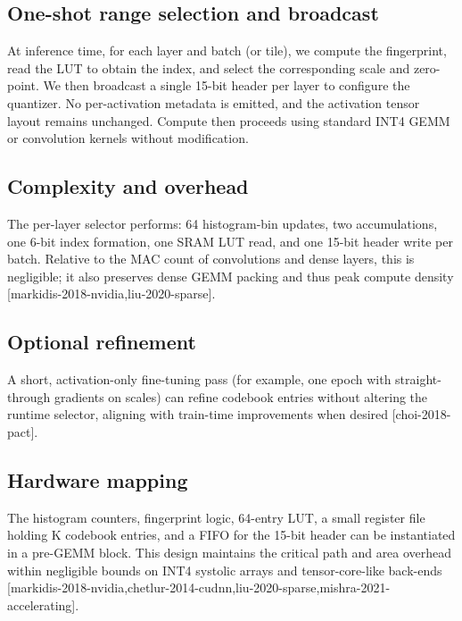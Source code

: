 \documentclass{article}
\begin{document}
\subsection{One-shot range selection and broadcast}
At inference time, for each layer and batch (or tile), we compute the fingerprint, read the LUT to obtain the index, and select the corresponding scale and zero-point. We then broadcast a single 15-bit header per layer to configure the quantizer. No per-activation metadata is emitted, and the activation tensor layout remains unchanged. Compute then proceeds using standard INT4 GEMM or convolution kernels without modification.

\subsection{Complexity and overhead}
The per-layer selector performs: 64 histogram-bin updates, two accumulations, one 6-bit index formation, one SRAM LUT read, and one 15-bit header write per batch. Relative to the MAC count of convolutions and dense layers, this is negligible; it also preserves dense GEMM packing and thus peak compute density [markidis-2018-nvidia,liu-2020-sparse].

\subsection{Optional refinement}
A short, activation-only fine-tuning pass (for example, one epoch with straight-through gradients on scales) can refine codebook entries without altering the runtime selector, aligning with train-time improvements when desired [choi-2018-pact].

\subsection{Hardware mapping}
The histogram counters, fingerprint logic, 64-entry LUT, a small register file holding K codebook entries, and a FIFO for the 15-bit header can be instantiated in a pre-GEMM block. This design maintains the critical path and area overhead within negligible bounds on INT4 systolic arrays and tensor-core-like back-ends [markidis-2018-nvidia,chetlur-2014-cudnn,liu-2020-sparse,mishra-2021-accelerating].
\end{document}
